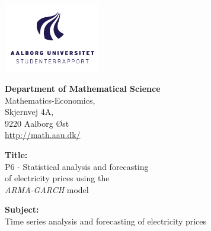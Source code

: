 
\begin{titlepage}
\thispagestyle{empty}
{}

\begin{minipage}[t]{0.48\textwidth}
\vspace*{-25pt}			%
\includegraphics[height=3cm]{1 Formalities/Intro/AAUlogo.pdf}
\end{minipage}
\hfill
\begin{minipage}[t]{0.48\textwidth}
{\small 
\textbf{Department of Mathematical Science}\\
Mathematics-Economics,\\
Skjernvej 4A,\\ 9220 Aalborg Øst \\ \hyperlink{http://math.aau.dk/}{http://math.aau.dk/}
}
\end{minipage}



\vspace*{1cm}

\begin{minipage}[t]{0.48\textwidth}
\textbf{Title:} \\[5pt]\hspace*{2ex}
\hspace*{-13pt}P6 - Statistical analysis and forecasting \\ of
electricity prices using the \\ \textit{ARMA-GARCH} model\\\hspace*{2ex}

\textbf{Subject:} \\[5pt]\hspace*{2ex}
\hspace*{-13pt}Time series analysis and forecasting of electricity prices\\\hspace*{2ex}
 

\end{minipage}
\end{titlepage}
